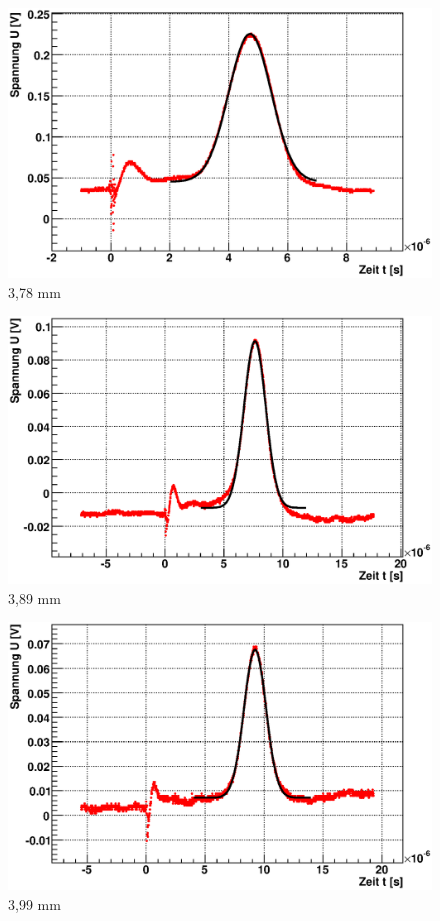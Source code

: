 \documentclass[12pt]{article}
\begin{document}
\begin{figure}[H]  
\begin{minipage}{0.33\linewidth}
\centering
\includegraphics[width=0.9\linewidth]{pictures/varDist/00.eps}
\small{3,78 mm}
\end{minipage}
\begin{minipage}{0.33\linewidth}
\centering
\includegraphics[width=0.9\linewidth]{pictures/varDist/09.eps}
\small{3,89 mm}
\end{minipage}
\begin{minipage}{0.33\linewidth}
\centering 
\includegraphics[width=0.9\linewidth]{pictures/varDist/01.eps}
\small{3,99 mm}
\end{minipage}
\end{figure}
\end{document}
